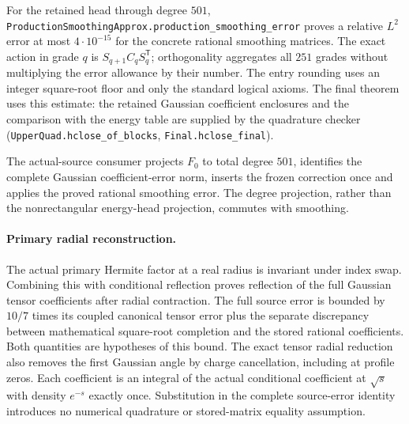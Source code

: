 \documentclass[11pt,a4paper]{article}
\newcommand{\lean}[1]{\texttt{\small #1}}
\begin{document}
For the retained head through degree $501$,
\texttt{ProductionSmoothingApprox.production\_smoothing\_error} proves a
relative $L^2$ error at most $4\cdot10^{-15}$ for the concrete rational
smoothing matrices. The exact action in grade $q$ is
$S_{q+1}C_qS_q^{\mathsf T}$; orthogonality aggregates all $251$ grades
without multiplying the error allowance by their number. The entry rounding
uses an integer square-root floor and only the standard logical axioms.
The final theorem uses this estimate: the retained Gaussian coefficient
enclosures and the comparison with the energy table are supplied by the
quadrature checker (\lean{UpperQuad.hclose\_of\_blocks}, \lean{Final.hclose\_final}).

The actual-source consumer projects $F_0$ to total degree $501$, identifies
the complete Gaussian coefficient-error norm, inserts the frozen correction
once and applies the proved rational smoothing error. The degree projection,
rather than the nonrectangular energy-head projection, commutes with smoothing.

\paragraph{Primary radial reconstruction.}
The actual primary Hermite factor at a real radius is invariant under index
swap. Combining this with conditional reflection proves reflection of the
full Gaussian tensor coefficients after radial contraction. The full source
error is bounded by $10/7$ times its coupled canonical tensor error plus the
separate discrepancy between mathematical square-root completion and the
stored rational coefficients. Both quantities are hypotheses of this bound.
The exact tensor radial reduction also removes the first Gaussian angle by
charge cancellation, including at profile zeros. Each coefficient is an
integral of the actual conditional coefficient at $\sqrt{s}$ with density
$e^{-s}$ exactly once. Substitution in the complete source-error identity
introduces no numerical quadrature or stored-matrix equality assumption.
\end{document}
